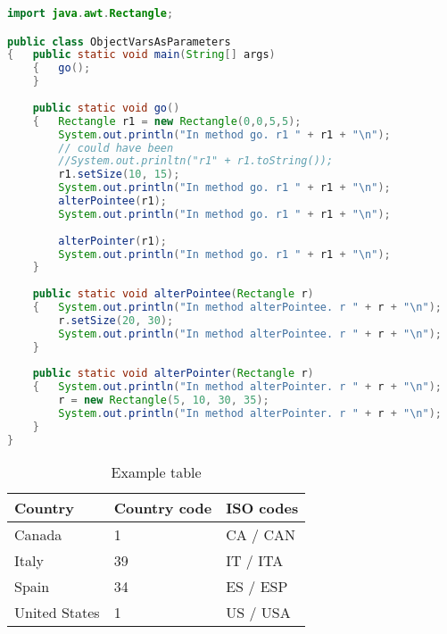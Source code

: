 \begin{lstlisting}[language=Java, caption=Java example, float, label=code:example]
import java.awt.Rectangle;

public class ObjectVarsAsParameters
{	public static void main(String[] args)
    {	go();
    }
    
    public static void go()
    {	Rectangle r1 = new Rectangle(0,0,5,5);
        System.out.println("In method go. r1 " + r1 + "\n");
        // could have been 
        //System.out.prinltn("r1" + r1.toString());
        r1.setSize(10, 15);
        System.out.println("In method go. r1 " + r1 + "\n");
        alterPointee(r1);
        System.out.println("In method go. r1 " + r1 + "\n");
        
        alterPointer(r1);
        System.out.println("In method go. r1 " + r1 + "\n");
    }
    
    public static void alterPointee(Rectangle r)
    {	System.out.println("In method alterPointee. r " + r + "\n");
        r.setSize(20, 30);
        System.out.println("In method alterPointee. r " + r + "\n");
    }
    
    public static void alterPointer(Rectangle r)
    {	System.out.println("In method alterPointer. r " + r + "\n");
        r = new Rectangle(5, 10, 30, 35);
        System.out.println("In method alterPointer. r " + r + "\n");
    }
}
\end{lstlisting}

\begin{table}[tbp]
    \centering
    \caption{Example table}
    \label{tab:example}
    \begin{tabular}{@{}lll@{}}
        \toprule
        Country       & Country code & ISO codes \\ \midrule
        Canada        & 1            & CA / CAN  \\
        Italy         & 39           & IT / ITA  \\
        Spain         & 34           & ES / ESP  \\
        United States & 1            & US / USA  \\ \bottomrule
    \end{tabular}
\end{table}


